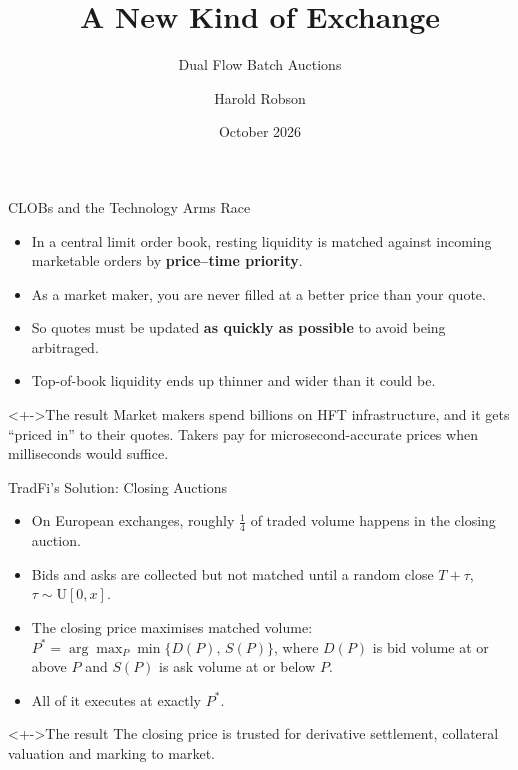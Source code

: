 \documentclass[aspectratio=169]{beamer}
\title{\texorpdfstring{\alert{A New Kind of Exchange}}{A New Kind of Exchange}}
\subtitle{Dual Flow Batch Auctions}
\author{Harold Robson}
\institute{Arbitrum Founder House Singapore $\cdot$ Robinhood Chain}
\date{October 2026}
\begin{document}
\maketitle

\begin{frame}{CLOBs and the Technology Arms Race}
  \begin{itemize}[<+->]
    \item In a central limit order book, resting liquidity is matched against
          incoming marketable orders by \textbf{price--time priority}.
    \item As a market maker, you are never filled at a better price than your quote.
    \item So quotes must be updated \textbf{as quickly as possible} to avoid
          being arbitraged.
    \item Top-of-book liquidity ends up thinner and wider than it could be.
  \end{itemize}
  \begin{alertblock}<+->{The result}
    Market makers spend billions on HFT infrastructure, and it gets ``priced in''
    to their quotes. Takers pay for microsecond-accurate prices when
    milliseconds would suffice.
  \end{alertblock}
\end{frame}

\begin{frame}{TradFi's Solution: Closing Auctions}
  \small
  \begin{itemize}[<+->]
    \item On European exchanges, roughly $\tfrac14$ of traded volume happens in
          the closing auction.
    \item Bids and asks are collected but not matched until a random close
          $T + \tau$, $\tau \sim \mathrm{U}[0, x]$.
    \item The closing price maximises matched volume:
          $P^* = \arg\max_P \min\{D(P),\, S(P)\}$, where $D(P)$ is bid volume
          at or above $P$ and $S(P)$ is ask volume at or below $P$.
    \item All of it executes at exactly $P^*$.
  \end{itemize}
  \begin{alertblock}<+->{The result}
    The closing price is trusted for derivative settlement, collateral
    valuation and marking to market.
  \end{alertblock}
\end{frame}
\end{document}
